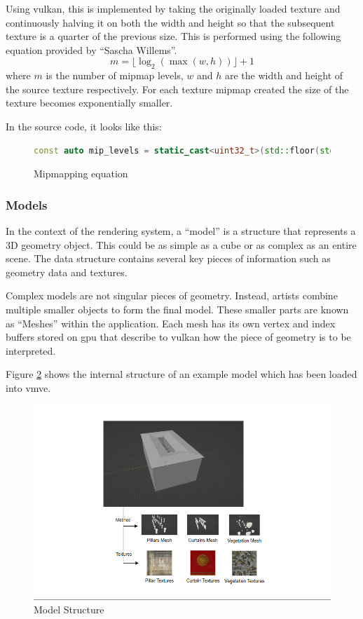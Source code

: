 \documentclass[11pt]{article}
\begin{document}
Using \gls*{vulkan}, this is implemented by taking the originally loaded texture
and continuously halving it on both the width and height so that the subsequent texture is
a quarter of the previous size. This is performed using the following equation provided by
``Sascha Willems''.
\begin{equation}
  m = \lfloor \log_2(\max(w, h)) \rfloor + 1
\end{equation}
where \(m\) is the number of mipmap levels, \(w\) and \(h\) are the width and
height of the source texture respectively. For each texture mipmap created the
size of the texture becomes exponentially smaller.

In the source code, it looks like this:
\begin{figure}[H]
  \centering
  \begin{lstlisting}[language=C++]
    const auto mip_levels = static_cast<uint32_t>(std::floor(std::log2(std::max(width, height)))) + 1;
  \end{lstlisting}
  \caption{Mipmapping equation}
  \label{fig:mipmapping_equation}
\end{figure}

\subsubsection{Models}
In the context of the rendering system, a ``model'' is a structure that
represents a 3D geometry object. This could be as simple as a cube or as complex
as an entire scene. The data structure contains several key pieces of
information such as geometry data and textures. 

Complex models are not singular pieces of geometry. Instead, artists combine
multiple smaller objects to form the final model. These smaller parts are known
as ``Meshes'' within the application. Each mesh has its own vertex and index
buffers stored on \gls*{gpu} that describe to \gls*{vulkan} how the piece of
geometry is to be interpreted.

Figure \ref{fig:model} shows the internal structure of an example model which
has been loaded into \gls*{vmve}.
\begin{figure}[H]
  \centering
  \includegraphics[width=\textwidth]{images/model.png}
  \caption{Model Structure}
  \label{fig:model}
\end{figure}
\end{document}
